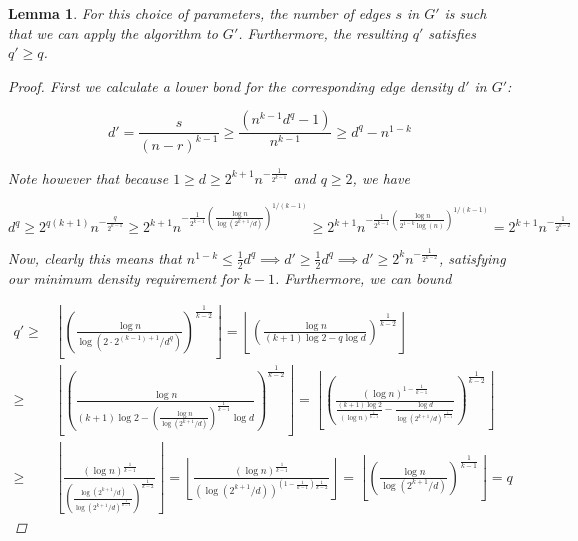 \documentclass[12pt]{article}
\newtheorem{lemma}[thm]{Lemma}
\begin{document}
    \begin{lemma} \label{lemma:q_prime}
        For this choice of parameters, the number of edges $s$ in $G'$
        is such that we can apply the algorithm to $G'$.
        Furthermore, the resulting $q'$ satisfies $q' \geq q$.

        \begin{proof}

            First we calculate a lower bond for the corresponding edge density $d'$ in $G'$:

            \begin{equation*}
                d' = \frac{s}{(n-r)^{k-1}} \geq \frac{\left(  n^{k-1} d^{q} - 1\right)}{n^{k-1}}
                \geq d^q - n^{1-k}
            \end{equation*}

            Note however that because $1 \geq d \geq 2^{k+1} n^{-\frac{1}{2^{k-1}}}$ and $q \geq 2$, we have

            \[
                d^q \geq 2^{q(k+1)}n^{-\frac{q}{2^{k-1}}} \geq
                2^{k+1} n^{-\frac{1}{2^{k-1}} \left( \frac{\log n}{\log (2^{k+1}/d)} \right)^{1/(k-1)}}
                \geq 2^{k+1} n^{-\frac{1}{2^{k-1}} \left( \frac{\log n}{2^{1-k} \log (n)} \right)^{1/(k-1)}}
                = 2^{k+1}n^{-\frac{1}{2^{k-2}}}
            \]

            Now, clearly this means that $n^{1-k} \leq \frac{1}{2} d^q \implies d' \geq \frac{1}{2}d^q \implies d' \geq 2^{k}n^{-\frac{1}{2^{k-2}}}$,
            satisfying our minimum density requirement for $k-1$.
            Furthermore, we can bound


            \begin{align*}
                q' \geq &
                \left\lfloor \left(  \frac{\log n}{\log (2 \cdot 2^{(k-1)+1}/d^q)} \right)^{\frac{1}{k-2}} \right\rfloor =
                \left\lfloor \left(  \frac{\log n}{(k+1) \log 2 - q \log d} \right)^{\frac{1}{k-2}} \right\rfloor \\
                \geq &
                \left\lfloor \left(  \frac{\log n}{(k+1) \log 2 - \left(  \frac{\log n}{\log (2^{k+1}/d)} \right)^{\frac{1}{k-1}}  \log d} \right)^{\frac{1}{k-2}} \right\rfloor
                =
                \left\lfloor \left(  \frac{(\log n)^{1-\frac{1}{k-1}}}{\frac{(k+1) \log 2}{(\log n)^{\frac{1}{k-1}}} - \frac{\log d}{\log (2^{k+1}/d)^{\frac{1}{k-1}}} } \right)^{\frac{1}{k-2}} \right\rfloor \\
                \geq &
                \left\lfloor  \frac{(\log n)^{\frac{1}{k-1}}}{\left(\frac{\log (2^{k+1}/d)}{\log (2^{k+1}/d)^{\frac{1}{k-1}}} \right)^{\frac{1}{k-2}} } \right\rfloor
                = \left\lfloor  \frac{(\log n)^{\frac{1}{k-1}}}{\left(\log (2^{k+1}/d)\right)^{(1-\frac{1}{k-1})\frac{1}{k-2}}} \right\rfloor
                = \left\lfloor \left(  \frac{\log n}{\log (2^{k+1}/d)} \right)^{\frac{1}{k-1}} \right\rfloor = q
            \end{align*}


\end{proof}
\end{lemma}
\end{document}
